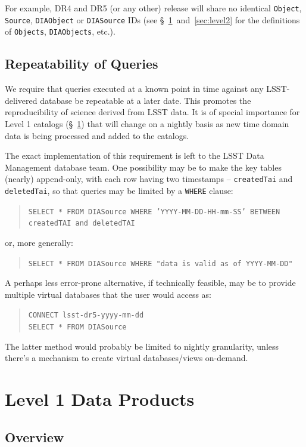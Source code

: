 \documentclass[12pt]{article}
\newcommand{\code}[1]{\texttt{#1}}
\newcommand{\DIASource}{\code{DIASource}\xspace}
\newcommand{\DIAObject}{\code{DIAObject}\xspace}
\newcommand{\DIAObjects}{\code{DIAObjects}\xspace}
\newcommand{\Object}{\code{Object}\xspace}
\newcommand{\Objects}{\code{Objects}\xspace}
\newcommand{\Source}{\code{Source}\xspace}
\newcommand{\req}[1]{\marginpar{\tiny #1}}
\newcommand{\dmreq}[1]{\req{DMS-REQ-#1}}
\begin{document}
For example, DR4 and DR5 (or any other) release will share no identical \Object, \Source, \DIAObject or \DIASource IDs (see \S~\ref{sec:level1}~and~\ref{sec:level2} for the definitions of \Objects, \DIAObjects, etc.).

\subsection{Repeatability of Queries}
\dmreq{0291}

We require that queries executed at a known point in time against any LSST-delivered database be repeatable at a later date. This promotes the reproducibility of science derived from LSST data. It is of special importance for Level 1 catalogs (\S~\ref{sec:level1}) that will change on a nightly basis as new time domain data is being processed and added to the catalogs.

The exact implementation of this requirement is left to the LSST Data Management database team. One possibility may be to make the key tables (nearly) append-only, with each row having two timestamps -- \texttt{createdTai} and \texttt{deletedTai}, so that queries may be limited by a \code{WHERE} clause:
%
\begin{quote}
\texttt{SELECT * FROM DIASource WHERE 'YYYY-MM-DD-HH-mm-SS' BETWEEN createdTAI and deletedTAI}
\end{quote}
%
or, more generally:
%
\begin{quote}
\code{SELECT * FROM DIASource WHERE "data is valid as of YYYY-MM-DD"}
\end{quote}

A perhaps less error-prone alternative, if technically feasible, may be to provide multiple virtual databases that the user would access as:
%
\begin{quote}
\texttt{CONNECT lsst-dr5-yyyy-mm-dd} \\
\texttt{SELECT * FROM DIASource}
\end{quote}
%
The latter method would probably be limited to nightly granularity, unless there's a mechanism to create virtual databases/views on-demand.

\clearpage

\section{Level 1 Data Products}
\label{sec:level1}

\subsection{Overview}
\end{document}
